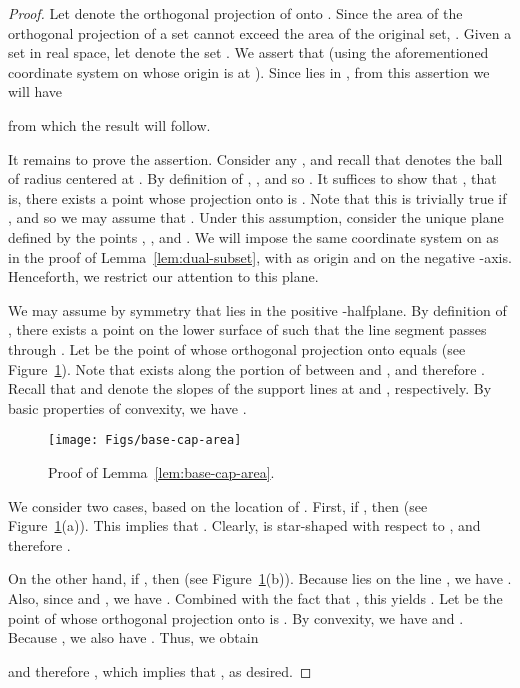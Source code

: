 \documentclass[11pt]{article}   \usepackage[letterpaper,hmargin=2.1cm,vmargin=3cm]{geometry}
\begin{document}
{\BaseCapAreaStmt*}


\begin{proof}
Let  denote the orthogonal projection of  onto . Since the area of the orthogonal projection of a set cannot exceed the area of the original set, . Given a set  in real space, let  denote the set . We assert that  (using the aforementioned coordinate system on  whose origin is at ). Since  lies in , from this assertion we will have

from which the result will follow.

It remains to prove the assertion. Consider any , and recall that  denotes the ball of radius  centered at . By definition of , , and so . It suffices to show that , that is, there exists a point  whose projection onto  is . Note that this is trivially true if , and so we may assume that . Under this assumption, consider the unique plane  defined by the points , , and . We will impose the same coordinate system on  as in the proof of Lemma~\ref{lem:dual-subset}, with  as origin and  on the negative -axis. Henceforth, we restrict our attention to this plane.

We may assume by symmetry that  lies in the positive -halfplane. By definition of , there exists a point  on the lower surface of  such that the line segment  passes through . Let  be the point of  whose orthogonal projection onto  equals  (see Figure~\ref{fig:base-cap-area}). Note that  exists along the portion of  between  and , and therefore . Recall that  and  denote the slopes of the support lines at  and , respectively. By basic properties of convexity, we have .

\begin{figure}[htbp]
  \centerline{\texttt{[image: Figs/base-cap-area]}}
  \caption{Proof of Lemma~\ref{lem:base-cap-area}.}
  \label{fig:base-cap-area}
\end{figure}


We consider two cases, based on the location of . First, if , then  (see Figure~\ref{fig:base-cap-area}(a)). This implies that . Clearly,  is star-shaped with respect to , and therefore .

On the other hand, if , then  (see Figure~\ref{fig:base-cap-area}(b)). Because  lies on the line , we have . Also, since  and , we have . Combined with the fact that , this yields . Let  be the point of  whose orthogonal projection onto  is . By convexity, we have  and . Because , we also have . Thus, we obtain

and therefore , which implies that , as desired.
\end{proof}
\end{document}
